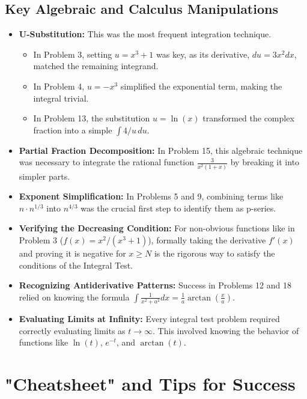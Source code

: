 \documentclass{article}
\begin{document}
\subsection{Key Algebraic and Calculus Manipulations}
\begin{itemize}
    \item \textbf{U-Substitution:} This was the most frequent integration technique.
    \begin{itemize}
        \item In Problem 3, setting $u = x^3+1$ was key, as its derivative, $du=3x^2dx$, matched the remaining integrand.
        \item In Problem 4, $u=-x^3$ simplified the exponential term, making the integral trivial.
        \item In Problem 13, the substitution $u=\ln(x)$ transformed the complex fraction into a simple $\int 4/u \, du$.
    \end{itemize}
    \item \textbf{Partial Fraction Decomposition:} In Problem 15, this algebraic technique was necessary to integrate the rational function $\frac{3}{x^2(1+x)}$ by breaking it into simpler parts.
    \item \textbf{Exponent Simplification:} In Problems 5 and 9, combining terms like $n \cdot n^{1/3}$ into $n^{4/3}$ was the crucial first step to identify them as p-series.
    \item \textbf{Verifying the Decreasing Condition:} For non-obvious functions like in Problem 3 ($f(x) = x^2/(x^3+1)$), formally taking the derivative $f'(x)$ and proving it is negative for $x \ge N$ is the rigorous way to satisfy the conditions of the Integral Test.
    \item \textbf{Recognizing Antiderivative Patterns:} Success in Problems 12 and 18 relied on knowing the formula $\int \frac{1}{x^2+a^2} dx = \frac{1}{a}\arctan(\frac{x}{a})$.
    \item \textbf{Evaluating Limits at Infinity:} Every integral test problem required correctly evaluating limits as $t \to \infty$. This involved knowing the behavior of functions like $\ln(t)$, $e^{-t}$, and $\arctan(t)$.
\end{itemize}

\section{"Cheatsheet" and Tips for Success}
\end{document}
